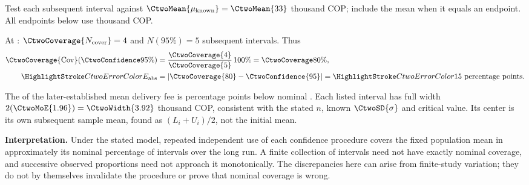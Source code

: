 
Test each subsequent interval against $\CtwoMean{\mu_{\mathrm{known}}}=\CtwoMean{33}$ thousand COP; include the mean when it equals an endpoint. All endpoints below use thousand COP.



At : $\CtwoCoverage{N_{\mathrm{cover}}}=4$ and $N(95\%)=5$ subsequent intervals. Thus
\[\begin{aligned}
\CtwoCoverage{\mathrm{Cov}}(\CtwoConfidence{95\%})&=\frac{\CtwoCoverage{4}}{\CtwoCoverage{5}}\,100\%=\CtwoCoverage{80\%},\\
\CtwoError{E_{\mathrm{abs}}}&=|\CtwoCoverage{80}-\CtwoConfidence{95}|=\CtwoError{15}\text{ percentage points}.
\end{aligned}\]

The  of the later-established mean delivery fee is  percentage points below nominal . Each listed interval has full width $2(\CtwoMoE{1.96})=\CtwoWidth{3.92}$ thousand COP, consistent with the stated $n$, known $\CtwoSD{\sigma}$ and critical value. Its center is its own subsequent sample mean, found as $(L_i+U_i)/2$, not the initial mean.

\textbf{Interpretation.} Under the stated model, repeated independent use of each confidence procedure covers the fixed population mean in approximately its nominal percentage of intervals over the long run. A finite collection of intervals need not have exactly nominal coverage, and successive observed proportions need not approach it monotonically. The discrepancies here can arise from finite-study variation; they do not by themselves invalidate the procedure or prove that nominal coverage is wrong.

